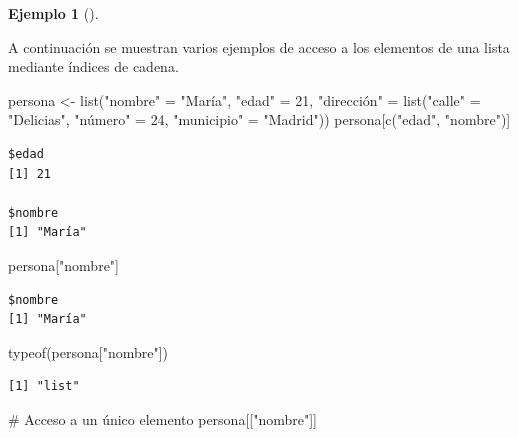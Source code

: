 \documentclass[
  a4paper,
]{scrreport}
\newenvironment{Shaded}{\begin{snugshade}}{\end{snugshade}}
\newcommand{\CommentTok}[1]{\textcolor[rgb]{0.37,0.37,0.37}{#1}}
\newcommand{\DecValTok}[1]{\textcolor[rgb]{0.68,0.00,0.00}{#1}}
\newcommand{\FunctionTok}[1]{\textcolor[rgb]{0.28,0.35,0.67}{#1}}
\newcommand{\NormalTok}[1]{\textcolor[rgb]{0.00,0.23,0.31}{#1}}
\newcommand{\OtherTok}[1]{\textcolor[rgb]{0.00,0.23,0.31}{#1}}
\newcommand{\StringTok}[1]{\textcolor[rgb]{0.13,0.47,0.30}{#1}}
\theoremstyle{definition}
\theoremstyle{definition}
\newtheorem{example}{Ejemplo}[chapter]
\theoremstyle{remark}
\begin{document}
\leavevmode{}%
\begin{example}[]\label{exm-acceso-listas-nombres}

A continuación se muestran varios ejemplos de acceso a los elementos de
una lista mediante índices de cadena.

\begin{Shaded}
\begin{Highlighting}[]
\NormalTok{persona }\OtherTok{\textless{}{-}} \FunctionTok{list}\NormalTok{(}\StringTok{"nombre"} \OtherTok{=} \StringTok{"María"}\NormalTok{, }\StringTok{"edad"} \OtherTok{=} \DecValTok{21}\NormalTok{, }\StringTok{"dirección"} \OtherTok{=} \FunctionTok{list}\NormalTok{(}\StringTok{"calle"} \OtherTok{=} \StringTok{"Delicias"}\NormalTok{, }\StringTok{"número"} \OtherTok{=} \DecValTok{24}\NormalTok{, }\StringTok{"municipio"} \OtherTok{=} \StringTok{"Madrid"}\NormalTok{))}
\NormalTok{persona[}\FunctionTok{c}\NormalTok{(}\StringTok{"edad"}\NormalTok{, }\StringTok{"nombre"}\NormalTok{)]}
\end{Highlighting}
\end{Shaded}

\begin{verbatim}
$edad
[1] 21

$nombre
[1] "María"
\end{verbatim}

\begin{Shaded}
\begin{Highlighting}[]
\NormalTok{persona[}\StringTok{"nombre"}\NormalTok{]}
\end{Highlighting}
\end{Shaded}

\begin{verbatim}
$nombre
[1] "María"
\end{verbatim}

\begin{Shaded}
\begin{Highlighting}[]
\FunctionTok{typeof}\NormalTok{(persona[}\StringTok{"nombre"}\NormalTok{])}
\end{Highlighting}
\end{Shaded}

\begin{verbatim}
[1] "list"
\end{verbatim}

\begin{Shaded}
\begin{Highlighting}[]
\CommentTok{\# Acceso a un único elemento}
\NormalTok{persona[[}\StringTok{"nombre"}\NormalTok{]]}
\end{Highlighting}
\end{Shaded}


\end{example}
\end{document}
